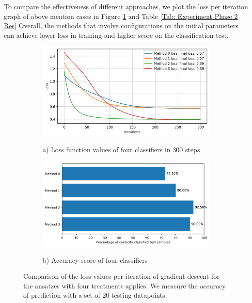 To compare the effectiveness of different approaches, we plot the loss per iteration graph of above mention cases in Figure \ref{Fig: Plot Loss and Accuracy} and Table \ref{Tab: Experiment Phase 2 Res}
Overall, the methods that involve configurations on the initial parameters can achieve lower loss in training and higher score on the classification test.

\begin{figure}
    \begin{subfigure}{\linewidth}
        \includegraphics[width=\linewidth]{Artefact/Appendices/loss.png}
        \centerline{a) Loss function values of four classifiers in 300 steps}
    \end{subfigure}
    \begin{subfigure}{\linewidth}
        \includegraphics[width=\linewidth]{Artefact/Appendices/accuracy.png}
        \centerline{b) Accuracy score of four classifiers}
    \end{subfigure}

    \caption{
        Comparison of the loss values per iteration of gradient descent for the ansatzes with four treatments applies.
        We measure the accuracy of prediction with a set of 20 testing datapoints.
    }
    \label{Fig: Plot Loss and Accuracy}
\end{figure}
